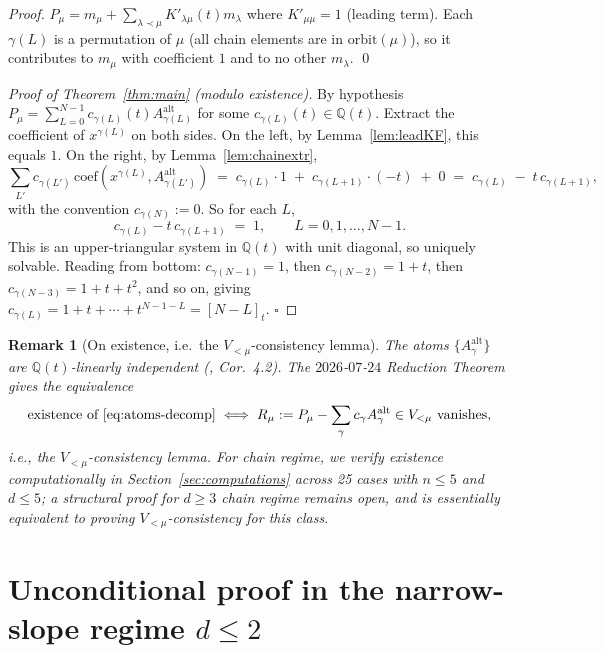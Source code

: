 \documentclass[11pt]{article}
\newtheorem*{remark*}{Remark}
\newcommand{\Aalt}{A^{\mathrm{alt}}}
\newcommand{\gauss}[1]{[#1]_t}
\begin{document}
\begin{proof}
$P_\mu = m_\mu + \sum_{\lambda \prec \mu} K'_{\lambda \mu}(t) m_\lambda$
where $K'_{\mu\mu} = 1$ (leading term).  Each $\gamma(L)$ is a permutation of
$\mu$ (all chain elements are in $\mathrm{orbit}(\mu)$), so it contributes to
$m_\mu$ with coefficient $1$ and to no other $m_\lambda$.  \qed
\end{proof}

\begin{proof}[Proof of Theorem~\ref{thm:main} (modulo existence)]
By hypothesis $P_\mu = \sum_{L=0}^{N-1} c_{\gamma(L)}(t) \Aalt_{\gamma(L)}$ for
some $c_{\gamma(L)}(t) \in \mathbb Q(t)$.  Extract the coefficient of
$x^{\gamma(L)}$ on both sides.  On the left, by Lemma~\ref{lem:leadKF},
this equals $1$.  On the right, by Lemma~\ref{lem:chainextr},
\[
  \sum_{L'} c_{\gamma(L')}\, \mathrm{coef}(x^{\gamma(L)}, \Aalt_{\gamma(L')})
  \;=\; c_{\gamma(L)} \cdot 1 \;+\; c_{\gamma(L+1)} \cdot (-t) \;+\; 0
  \;=\; c_{\gamma(L)} \;-\; t\, c_{\gamma(L+1)},
\]
with the convention $c_{\gamma(N)} := 0$.  So for each $L$,
\begin{equation}\label{eq:extractionsystem}
  c_{\gamma(L)} - t\, c_{\gamma(L+1)} \;=\; 1, \qquad L = 0, 1, \ldots, N-1.
\end{equation}
This is an upper-triangular system in $\mathbb Q(t)$ with unit diagonal, so
uniquely solvable.  Reading from bottom: $c_{\gamma(N-1)} = 1$, then
$c_{\gamma(N-2)} = 1 + t$, then $c_{\gamma(N-3)} = 1 + t + t^2$, and so on,
giving $c_{\gamma(L)} = 1 + t + \cdots + t^{N-1-L} = \gauss{N-L}$. $\square$
\end{proof}

\begin{remark*}[On existence, i.e.\ the $V_{<\mu}$-consistency lemma]\label{rem:existence}
The atoms $\{\Aalt_\gamma\}$ are $\mathbb Q(t)$-linearly independent (\cite{clio-0723},
Cor.~4.2).  The $2026$-$07$-$24$ Reduction Theorem gives the equivalence
\[
  \text{existence of } \eqref{eq:atoms-decomp} \iff
  R_\mu := P_\mu - \sum_\gamma c_\gamma \Aalt_\gamma \in V_{<\mu} \text{ vanishes},
\]
i.e., the $V_{<\mu}$-consistency lemma.  For chain regime, we verify
existence computationally in Section~\ref{sec:computations} across
25 cases with $n \le 5$ and $d \le 5$; a structural proof for
$d \ge 3$ chain regime remains open, and is essentially equivalent to
proving $V_{<\mu}$-consistency for this class.
\end{remark*}

\section{Unconditional proof in the narrow-slope regime $d \le 2$}\label{sec:narrow}
\end{document}
